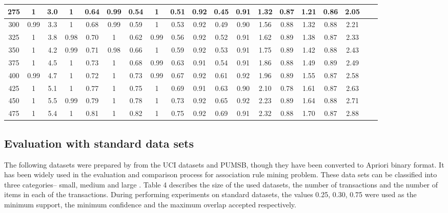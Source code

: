 \documentclass[preprint,12pt]{elsarticle}
\begin{document}
\begin{landscape}
\begin{table}[b]
\begin{tabular}{c c c  c c c c c c c c c c c c c c c c}
275		&		1    & 3.0	&	1    & 0.64 	&		0.99 & 	0.54	&		1    & 0.51			&	 0.92 &	0.45  &  0.91 & 1.32  &	0.87 &	1.21 &	0.86 & 	2.05 \\\hline
300		&		0.99 & 3.3	&	1    & 0.68   &		0.99 & 	0.59	&		1    & 0.53   	&	 0.92 &	0.49  &  0.90 & 1.56  &	0.88 &	1.32 &	0.88 &  2.21\\\hline
325		&		1    & 3.8  & 0.98 & 0.70  	&		1    & 	0.62	&		0.99 & 0.56			&	 0.92 &	0.52  &  0.91 & 1.62  &	0.89 &	1.38 &	0.87 & 	2.33 \\\hline
350		&		1    & 4.2	& 0.99 & 0.71		&		0.98 &  0.66	&		1    & 0.59			&	 0.92 &	0.53  &  0.91 & 1.75  &	0.89 &	1.42 &	0.88 & 	2.43 \\\hline
375		&		1    & 4.5  & 1    & 0.73		&		1    & 	0.68	&		0.99 & 0.63			&	 0.91 &	0.54  &  0.91 & 1.86  &	0.88 &	1.49 &	0.89 & 	2.49 \\\hline
400		&		0.99 & 4.7  & 1    & 0.72		&		1    & 	0.73	&		0.99 & 0.67	  	&	 0.92 &	0.61  &  0.92 & 1.96  &	0.89 &	1.55 &	0.87 & 	2.58 \\\hline
425		&		1    & 5.1  & 1    & 0.77		&		1    & 	0.75	&		1    & 0.69			&	 0.91 &	0.63  &  0.90 & 2.10  &	0.78 &	1.61 &	0.87 & 	2.63 \\\hline
450		&		1    & 5.5  & 0.99 & 0.79		&		1    & 	0.78	&		1    & 0.73			&	 0.92 &	0.65  &  0.92 & 2.23  &	0.89 &	1.64 &	0.88 & 	2.71 \\\hline
475		&		1    & 5.4  & 1    & 0.81		&		1    & 	0.82	&		1    & 0.75			&	 0.92 &	0.69  &  0.91 & 2.32  &	0.88 &	1.70 &	0.87 & 	2.88 \\\hline
\bottomrule
\end{tabular}
\end{table}
\end{landscape}

\subsection{Evaluation with standard data sets}
The following datasets were prepared by \cite{28} from the UCI datasets and PUMSB, 
though they have been converted to Apriori binary format. It has been widely used in 
the evaluation and comparison process for association rule mining problem. These data sets can be classified into three categories-- 
small, medium and large \cite{29}. Table 4 describes the size of the used datasets, the number of transactions and the number
of items in each of the transactions. During performing experiments on standard datasets, the values 0.25, 0.30, 0.75 were used as the minimum support, the minimum confidence and the maximum overlap accepted respectively.
 
\end{document}
